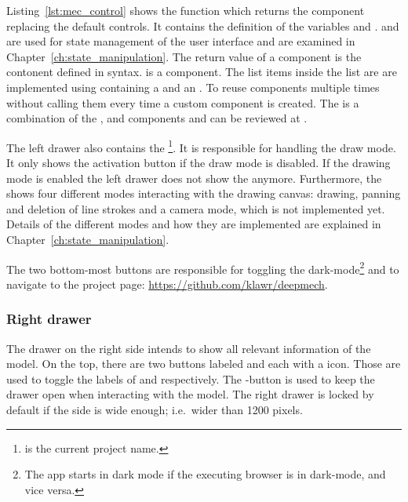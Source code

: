 Listing~\ref{lst:mec_control} shows the function which returns the component replacing the default  controls.
It contains the definition of the variables  and .
 and  are used for state management of the user interface and are examined in Chapter~\ref{ch:state_manipulation}.
The return value of a component is the contonent defined in  syntax.
 is a  component.
The list items inside the list are are implemented using  containing a  and an .
To reuse  components multiple times without calling them every time a custom  component is created.
The  is a combination of the ,  and  components and can be reviewed at .

The left drawer also contains the \footnote{ is the current project name.}.
It is responsible for handling the draw mode.
It only shows the activation button if the draw mode is disabled.
If the drawing mode is enabled the left drawer does not show the  anymore.
Furthermore, the  shows four different modes interacting with the drawing canvas: drawing, panning and deletion of line strokes and a camera mode, which is not implemented yet.
Details of the different modes and how they are implemented are explained in Chapter~\ref{ch:state_manipulation}.

The two bottom-most buttons are responsible for toggling the dark-mode\footnote{The app starts in dark mode if the executing browser is in dark-mode, and vice versa.} and to navigate to the project page: \url{https://github.com/klawr/deepmech}.

\subsubsection{Right drawer}

The drawer on the right side intends to show all relevant information of the  model.
On the top, there are two buttons labeled  and  each with a  icon.
Those are used to toggle the labels of  and  respectively.
The -button is used to keep the drawer open when interacting with the model.
The right drawer is locked by default if the side is wide enough; i.e.\ wider than 1200 pixels.

